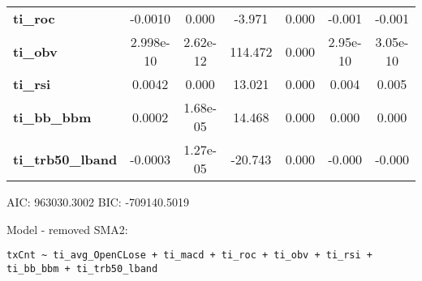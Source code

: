 \begin{center}
\begin{tabular}{lcccccc}
\textbf{ti\_roc}            &      -0.0010  &        0.000     &    -3.971  &         0.000        &       -0.001    &       -0.001     \\
\textbf{ti\_obv}            &    2.998e-10  &     2.62e-12     &   114.472  &         0.000        &     2.95e-10    &     3.05e-10     \\
\textbf{ti\_rsi}            &       0.0042  &        0.000     &    13.021  &         0.000        &        0.004    &        0.005     \\
\textbf{ti\_bb\_bbm}        &       0.0002  &     1.68e-05     &    14.468  &         0.000        &        0.000    &        0.000     \\
\textbf{ti\_trb50\_lband}   &      -0.0003  &     1.27e-05     &   -20.743  &         0.000        &       -0.000    &       -0.000     \\
\bottomrule
\end{tabular}
\end{center}

AIC: 963030.3002 BIC: -709140.5019

Model - removed SMA2: \begin{verbatim}txCnt ~ ti_avg_OpenCLose + ti_macd + ti_roc + ti_obv + ti_rsi + ti_bb_bbm + ti_trb50_lband\end{verbatim}

